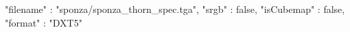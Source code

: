 { 
	"filename" : "sponza/sponza_thorn_spec.tga", 
	"srgb" : false,
	"isCubemap" : false,
	"format" : "DXT5"
}